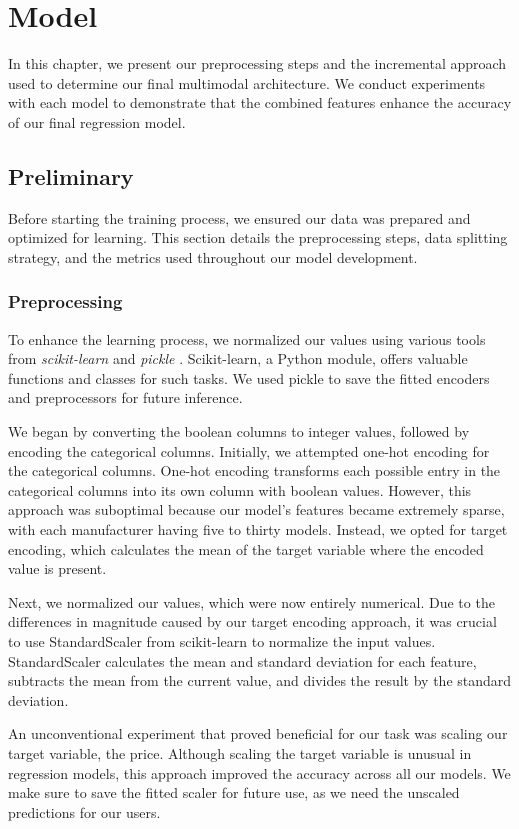 \chapter{Model}
In this chapter, we present our preprocessing steps and the incremental approach used to determine our final multimodal architecture. We conduct experiments with each model to demonstrate that the combined features enhance the accuracy of our final regression model.

\section{Preliminary}
Before starting the training process, we ensured our data was prepared and optimized for learning. This section details the preprocessing steps, data splitting strategy, and the metrics used throughout our model development.

\subsection{Preprocessing}
To enhance the learning process, we normalized our values using various tools from \textit{scikit-learn} \cite{scikit-learn} and \textit{pickle} \cite{pickle}. Scikit-learn, a Python module, offers valuable functions and classes for such tasks. We used pickle to save the fitted encoders and preprocessors for future inference.

We began by converting the boolean columns to integer values, followed by encoding the categorical columns. Initially, we attempted one-hot encoding for the categorical columns. One-hot encoding transforms each possible entry in the categorical columns into its own column with boolean values. However, this approach was suboptimal because our model's features became extremely sparse, with each manufacturer having five to thirty models. Instead, we opted for target encoding, which calculates the mean of the target variable where the encoded value is present.

Next, we normalized our values, which were now entirely numerical. Due to the differences in magnitude caused by our target encoding approach, it was crucial to use StandardScaler from scikit-learn to normalize the input values. StandardScaler calculates the mean and standard deviation for each feature, subtracts the mean from the current value, and divides the result by the standard deviation.

An unconventional experiment that proved beneficial for our task was scaling our target variable, the price. Although scaling the target variable is unusual in regression models, this approach improved the accuracy across all our models. We make sure to save the fitted scaler for future use, as we need the unscaled predictions for our users.

